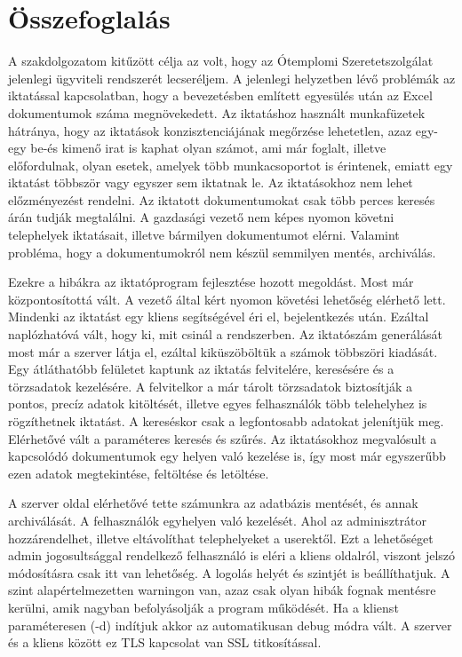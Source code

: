 \documentclass[
]{thesis-ekf}
\theoremstyle{definition}
\theoremstyle{remark}
\begin{document}
\chapter{Összefoglalás}
A szakdolgozatom kitűzött célja az volt, hogy az Ótemplomi Szeretetszolgálat jelenlegi ügyviteli rendszerét lecseréljem. A jelenlegi helyzetben lévő problémák az iktatással kapcsolatban, hogy a bevezetésben említett egyesülés után az Excel dokumentumok száma megnövekedett. Az iktatáshoz használt munkafüzetek hátránya, hogy az iktatások konzisztenciájának megőrzése lehetetlen, azaz egy-egy be-és kimenő irat is kaphat olyan számot, ami már foglalt, illetve előfordulnak, olyan esetek, amelyek több munkacsoportot is érintenek, emiatt egy iktatást többször vagy egyszer sem iktatnak le. Az iktatásokhoz nem lehet előzményezést rendelni. Az iktatott dokumentumokat csak több perces keresés árán tudják megtalálni. A gazdasági vezető nem képes nyomon követni telephelyek iktatásait, illetve bármilyen dokumentumot elérni.  Valamint probléma, hogy a dokumentumokról nem készül semmilyen mentés, archiválás.

Ezekre a hibákra az iktatóprogram fejlesztése hozott megoldást. Most már központosítottá vált. A vezető által kért nyomon követési lehetőség elérhető lett. Mindenki az iktatást egy kliens segítségével éri el, bejelentkezés után. Ezáltal naplózhatóvá vált, hogy ki, mit csinál a rendszerben. Az iktatószám generálását most már a szerver látja el, ezáltal kiküszöböltük a számok többszöri kiadását. Egy átláthatóbb felületet kaptunk az iktatás felvitelére, keresésére és a törzsadatok kezelésére.  A felvitelkor a már tárolt törzsadatok biztosítják a pontos, precíz adatok kitöltését, illetve egyes felhasználók több telehelyhez is rögzíthetnek iktatást.  A kereséskor csak a legfontosabb adatokat jelenítjük meg. Elérhetővé vált a paraméteres keresés és szűrés.  Az iktatásokhoz megvalósult a kapcsolódó dokumentumok egy helyen való kezelése is, így most már egyszerűbb ezen adatok megtekintése, feltöltése és letöltése. 

A szerver oldal elérhetővé tette számunkra az adatbázis mentését, és annak archiválását. A felhasználók egyhelyen való kezelését. Ahol az adminisztrátor hozzárendelhet, illetve eltávolíthat telephelyeket a userektől. Ezt a lehetőséget admin jogosultsággal rendelkező felhasználó is eléri a kliens oldalról, viszont jelszó módosításra csak itt van lehetőség.  A logolás helyét és szintjét is beállíthatjuk. A szint alapértelmezetten warningon van, azaz csak olyan hibák fognak mentésre kerülni, amik nagyban befolyásolják a program működését. Ha a klienst paraméteresen (-d) indítjuk akkor az automatikusan debug módra vált. A szerver és a kliens között ez TLS kapcsolat van SSL titkosítással. 
\end{document}
